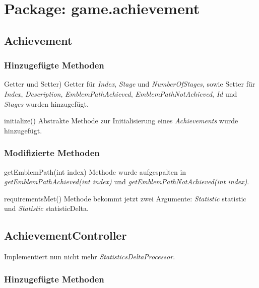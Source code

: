 \section{Package: game.achievement}

\subsection{Achievement}

\subsubsection{Hinzugefügte Methoden}

\begin{description}
	\item{Getter und Setter)}
	Getter für \emph{Index}, \emph{Stage} und \emph{NumberOfStages}, sowie Setter für \emph{Index}, \emph{Description}, \emph{EmblemPathAchieved}, \emph{EmblemPathNotAchieved}, \emph{Id} und \emph{Stages} wurden hinzugefügt.
	
	\item{initialize()}
	Abstrakte Methode zur Initialisierung eines \emph{Achievements} wurde hinzugefügt.

	
\end{description}



\subsubsection{Modifizierte Methoden}

\begin{description}
	\item{getEmblemPath(int index)}
	Methode wurde aufgespalten in \emph{getEmblemPathAchieved(int index)} und \emph{getEmblemPathNotAchieved(int index)}.
	
	\item{requirementsMet()}
	Methode bekommt jetzt zwei Argumente: \emph{Statistic} statistic und \emph{Statistic} statisticDelta.
\end{description}


\subsection{AchievementController}
Implementiert nun nicht mehr \emph{StatisticsDeltaProcessor}.

\subsubsection{Hinzugefügte Methoden}

